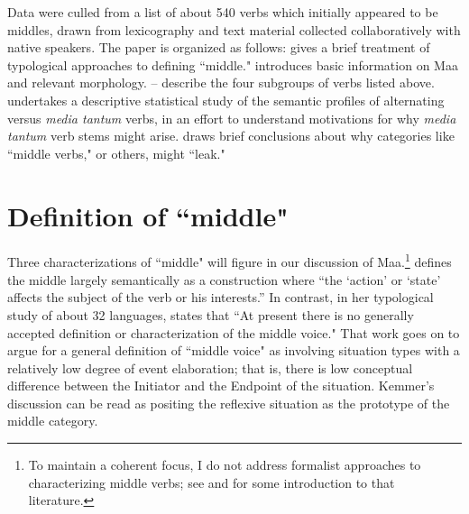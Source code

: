 \documentclass[output=paper,colorlinks,citecolor=brown
]{langscibook}
\begin{document}
Data were culled from a list of about 540 verbs which initially appeared to be middles, drawn from lexicography and text material collected collaboratively with native speakers. The paper is organized as follows:  gives a brief treatment of typological approaches to defining ``middle."  introduces basic information on Maa and relevant morphology. -- describe the four subgroups of verbs listed above.  undertakes a descriptive statistical study of the semantic profiles of alternating versus \textit{media tantum} verbs, in an effort to understand motivations for why \textit{media tantum} verb stems might arise.  draws brief conclusions about why categories like ``middle verbs," or others, might ``leak."

\section{Definition of ``middle"}\label{sec:Payne:Definition}

Three characterizations of ``middle" will figure in our discussion of Maa.\footnote{To maintain a coherent focus, I do not address formalist approaches to characterizing middle verbs; see \citet{Embick2004} and \citet{Grestenberger2018} for some introduction to that literature.} \citet[373]{Lyons1968} defines the middle largely semantically as a construction where ``the `action’ or `state’ affects the subject of the verb or his interests.” In contrast, in her typological study of about 32 languages, \citet[3]{Kemmer1993} states that ``At present there is no generally accepted definition or characterization of the middle voice." That work goes on to argue for a general definition of ``middle voice" as involving situation types with a relatively low degree of event elaboration; that is, there is low conceptual difference between the Initiator and the Endpoint of the situation. Kemmer's discussion can be read as positing the reflexive situation as the prototype of the middle category. 
\end{document}
